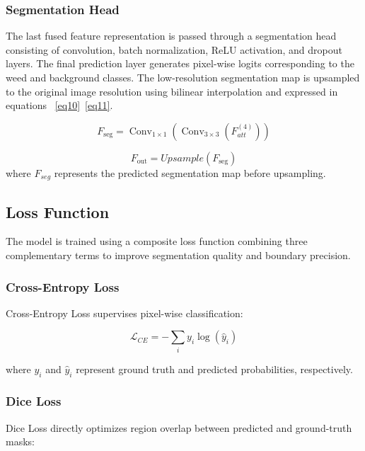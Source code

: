 \documentclass[pdflatex,sn-mathphys-num]{sn-jnl}
\begin{document}
\subsubsection{Segmentation Head}
The last fused feature representation is passed through a segmentation head consisting of convolution, batch normalization, ReLU activation, and dropout layers. The final prediction layer generates pixel-wise logits corresponding to the weed and background classes. 
The low-resolution segmentation map is upsampled to the original image resolution using bilinear interpolation and expressed in equations ~\ref{eq10}~\ref{eq11}.

\begin{equation}
F_{\text{seg}} =
\operatorname{Conv}_{1\times1}
\left(
\operatorname{Conv}_{3\times3}
\left(F_{att}^{(4)}\right)
\right)
\label{eq10}
\end{equation}

\begin{equation}
F_{\text{out}} = Upsample(F_{\text{seg}})\label{eq11}
\end{equation}
where $F_{seg}$ represents the predicted segmentation map before upsampling.
\subsection{Loss Function}

The model is trained using a composite loss function combining three complementary terms to improve segmentation quality and boundary precision.

\subsubsection{Cross-Entropy Loss}

Cross-Entropy Loss supervises pixel-wise classification:

\begin{equation}
\mathcal{L}_{CE} = - \sum_{i} y_i \log(\hat{y}_i)
\label{eq:ce_loss}
\end{equation}

where $y_i$ and $\hat{y}_i$ represent ground truth and predicted probabilities, respectively.

\subsubsection{Dice Loss}

Dice Loss directly optimizes region overlap between predicted and ground-truth masks:
\end{document}
